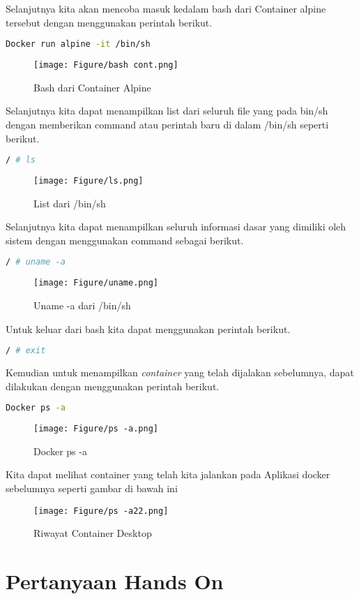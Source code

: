 \documentclass[11pt,a4paper]{article}
\begin{document}
\newpage
Selanjutnya kita akan mencoba masuk kedalam bash dari Container alpine tersebut dengan menggunakan perintah berikut.
\begin{lstlisting}[language = bash]
	Docker run alpine -it /bin/sh 
\end{lstlisting}
\begin{figure}[h]
	\centering
	\texttt{[image: Figure/bash cont.png]}
	\caption{Bash dari Container Alpine}
\end{figure}
Selanjutnya kita dapat menampilkan list dari seluruh file yang pada bin/sh dengan memberikan command atau perintah baru di dalam /bin/sh seperti berikut.
\begin{lstlisting}[language = bash]
	/ # ls
\end{lstlisting}
\begin{figure}[h]
	\centering
	\texttt{[image: Figure/ls.png]}
	\caption{List dari /bin/sh}
\end{figure}
Selanjutnya kita dapat menampilkan seluruh informasi dasar yang dimiliki oleh sistem dengan menggunakan command sebagai berikut.
\begin{lstlisting}[language = bash]
	/ # uname -a
\end{lstlisting}
\begin{figure}[h]
	\centering
	\texttt{[image: Figure/uname.png]}
	\caption{Uname -a dari /bin/sh}
\end{figure}
Untuk keluar dari bash kita dapat menggunakan perintah berikut.
\begin{lstlisting}[language = bash]
	/ # exit
\end{lstlisting}
Kemudian untuk menampilkan \textit{container} yang telah dijalakan sebelumnya, dapat dilakukan dengan menggunakan perintah berikut.
\begin{lstlisting}[language = bash]
	Docker ps -a
\end{lstlisting}
\begin{figure}[h]
	\centering
	\texttt{[image: Figure/ps -a.png]}
	\caption{Docker ps -a}
\end{figure}
\newpage
Kita dapat melihat container yang telah kita jalankan pada Aplikasi docker sebelumnya seperti gambar di bawah ini
\begin{figure}[h]
	\centering
	\texttt{[image: Figure/ps -a22.png]}
	\caption{Riwayat Container Desktop}
\end{figure}
\section{Pertanyaan Hands On}
\end{document}
